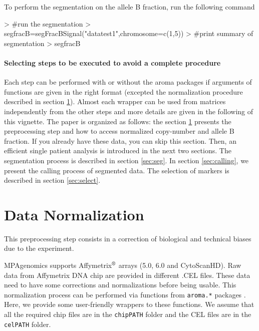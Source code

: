 \documentclass[a4paper,10pt]{article}
\begin{document}
				To perform the segmentation on the allele B fraction, run the following command
\begin{Schunk}
\begin{Sinput}
> #run the segmentation
> segfracB=segFracBSignal("datatest1",chromosome=c(1,5))
> #print summary of segmentation
> segfracB
\end{Sinput}
\end{Schunk}
				 	
		
			\paragraph{Selecting steps to be executed to avoid a complete procedure}

				Each step can be performed with or without the aroma packages if arguments of functions are given in the right format (excepted the normalization procedure described in section \ref{sec:norm}). Almost each wrapper can be used from matrices independently from the other steps and more details are given in the following of this vignette. 
				The paper is organized as follows: the section \ref{sec:norm} presents the preprocessing step and how to access normalized copy-number and allele B fraction. If you already have these data, you can skip this section. Then, an efficient single patient analysis is introduced in the next two sections. The segmentation process is described in section \ref{sec:seg}. In section \ref{sec:calling}, we present the calling process of segmented data. The selection of markers is described in section \ref{sec:select}.


	
\section{Data Normalization}
	\label{sec:norm}

	This preprocessing step consists in a correction of biological and technical biases due to the experiment.
  
  MPAgenomics supports Affymetrix$^{\mbox{\scriptsize{\textregistered}}}$ arrays (5.0, 6.0 and CytoScanHD).	Raw data from Affymetrix DNA chip are provided in different .CEL files. These data need to have some corrections and normalizations before being usable.
  This normalization process can be performed via functions from \texttt{aroma.*} packages \cite{aroma} \cite{affy}. Here, we provide some user-friendly wrappers to these functions.
	We assume that all the required chip files are in the \texttt{chipPATH} folder and the CEL files are in the \texttt{celPATH} folder.
	
\end{document}
